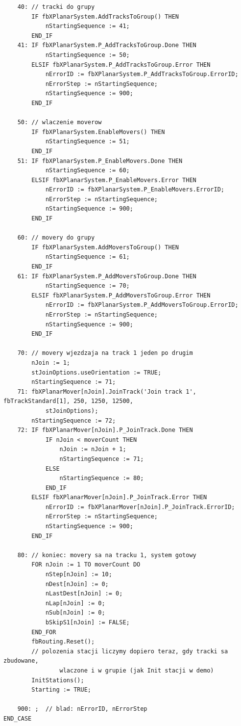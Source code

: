 \documentclass[11pt,a4paper]{report}
\begin{document}
{\begin{verbatim}
    40: // tracki do grupy
        IF fbXPlanarSystem.AddTracksToGroup() THEN
            nStartingSequence := 41;
        END_IF
    41: IF fbXPlanarSystem.P_AddTracksToGroup.Done THEN
            nStartingSequence := 50;
        ELSIF fbXPlanarSystem.P_AddTracksToGroup.Error THEN
            nErrorID := fbXPlanarSystem.P_AddTracksToGroup.ErrorID;
            nErrorStep := nStartingSequence;
            nStartingSequence := 900;
        END_IF

    50: // wlaczenie moverow
        IF fbXPlanarSystem.EnableMovers() THEN
            nStartingSequence := 51;
        END_IF
    51: IF fbXPlanarSystem.P_EnableMovers.Done THEN
            nStartingSequence := 60;
        ELSIF fbXPlanarSystem.P_EnableMovers.Error THEN
            nErrorID := fbXPlanarSystem.P_EnableMovers.ErrorID;
            nErrorStep := nStartingSequence;
            nStartingSequence := 900;
        END_IF

    60: // movery do grupy
        IF fbXPlanarSystem.AddMoversToGroup() THEN
            nStartingSequence := 61;
        END_IF
    61: IF fbXPlanarSystem.P_AddMoversToGroup.Done THEN
            nStartingSequence := 70;
        ELSIF fbXPlanarSystem.P_AddMoversToGroup.Error THEN
            nErrorID := fbXPlanarSystem.P_AddMoversToGroup.ErrorID;
            nErrorStep := nStartingSequence;
            nStartingSequence := 900;
        END_IF

    70: // movery wjezdzaja na track 1 jeden po drugim
        nJoin := 1;
        stJoinOptions.useOrientation := TRUE;
        nStartingSequence := 71;
    71: fbXPlanarMover[nJoin].JoinTrack('Join track 1', fbTrackStandard[1], 250, 1250, 12500,
            stJoinOptions);
        nStartingSequence := 72;
    72: IF fbXPlanarMover[nJoin].P_JoinTrack.Done THEN
            IF nJoin < moverCount THEN
                nJoin := nJoin + 1;
                nStartingSequence := 71;
            ELSE
                nStartingSequence := 80;
            END_IF
        ELSIF fbXPlanarMover[nJoin].P_JoinTrack.Error THEN
            nErrorID := fbXPlanarMover[nJoin].P_JoinTrack.ErrorID;
            nErrorStep := nStartingSequence;
            nStartingSequence := 900;
        END_IF

    80: // koniec: movery sa na tracku 1, system gotowy
        FOR nJoin := 1 TO moverCount DO
            nStep[nJoin] := 10;
            nDest[nJoin] := 0;
            nLastDest[nJoin] := 0;
            nLap[nJoin] := 0;
            nSub[nJoin] := 0;
            bSkipS1[nJoin] := FALSE;
        END_FOR
        fbRouting.Reset();
        // polozenia stacji liczymy dopiero teraz, gdy tracki sa zbudowane,
                wlaczone i w grupie (jak Init stacji w demo)
        InitStations();
        Starting := TRUE;

    900: ;  // blad: nErrorID, nErrorStep
END_CASE
\end{verbatim}}
\end{document}
